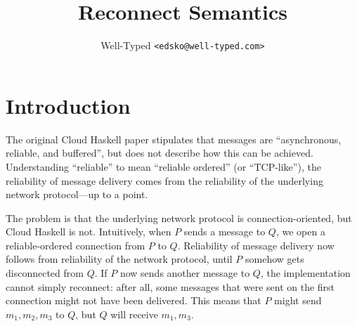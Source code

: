 \documentclass[10pt]{article}
\begin{document}
\newcommand{\semNs}{\mathit{ns}}
\newcommand{\semEth}{\mathit{eth}}
\newcommand{\semPg}{\mathit{pg}}
\newcommand{\semNid}{\mathit{nid}}
\newcommand{\semNc}{\mathit{nc}}
\newcommand{\semRecon}{\mathrm{reconnect}}
\newcommand{\semDisconnect}{\mathrm{disconnect}}
\newcommand{\semDropped}{\mathrm{dropped}}
\newcommand{\semMessage}{\mathrm{message}}
\newcommand{\semPid}{\mathit{pid}}

\newcommand{\semSystem}[2]{\llbracket #1, #2 \rrbracket}
\newcommand{\semNode}[3]{[ #1, #2, #3 ]}
\newcommand{\semStdNode}[1]{\semNode{\semPg_{#1}}{\semNid_{#1}}{\semNc_{#1}}}
\newcommand{\semProc}[3]{\langle #1, #2, #3 \rangle}
\newcommand{\semStdProc}[1]{\semProc{e}{\semPid}{q}}

\newcommand{\semDied}[2]{\mathrm{died}(#1, #2)}
\newcommand{\semParN}{\mathrel{{\parallel}_N}}
\newcommand{\semParP}{\mathrel{{\parallel}_P}}
\newcommand{\semEthMatch}[3]{\mathrm{ethMatch}(#1, #2, #3)}

\lstset{basicstyle=\ttfamily\small}

\title{Reconnect Semantics}
\author{Well-Typed \texttt{<edsko@well-typed.com>}}
\maketitle

\section*{Introduction}

The original Cloud Haskell paper stipulates that messages are ``asynchronous,
reliable, and buffered'', but does not describe how this can be achieved.
Understanding ``reliable'' to mean ``reliable ordered'' (or ``TCP-like''), 
the reliability of message delivery comes from the reliability of the
underlying network protocol---up to a point. 

The problem is that the underlying network protocol is connection-oriented, but
Cloud Haskell is not. Intuitively, when $P$ sends a message to $Q$, we open a
reliable-ordered connection from $P$ to $Q$. Reliability of message delivery
now follows from reliability of the network protocol, until $P$ somehow gets
disconnected from $Q$. If $P$ now sends another message to $Q$, the
implementation cannot simply reconnect: after all, some messages that were sent
on the first connection might not have been delivered. This means that $P$
might send $m_1, m_2, m_3$ to $Q$, but $Q$ will receive $m_1, m_3$. 
\end{document}
